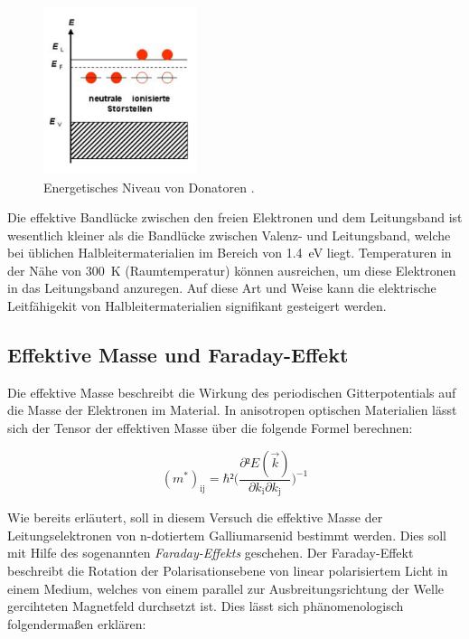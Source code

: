 \begin{figure}[H]
    \centering
    \includegraphics[width=0.4\textwidth]{content/nDot.png}
    \caption{Energetisches Niveau von Donatoren \cite{nDotierung}.}
    \label{fig:nDot}
\end{figure}

\noindent Die effektive Bandlücke zwischen den freien Elektronen und dem Leitungsband ist wesentlich kleiner als die Bandlücke 
zwischen Valenz- und Leitungsband, welche bei üblichen Halbleitermaterialien im Bereich von \qty{1.4}{\electronvolt} liegt. Temperaturen 
in der Nähe von \qty{300}{\kelvin} (Raumtemperatur) können ausreichen, um diese Elektronen in das Leitungsband anzuregen. 
Auf diese Art und Weise kann die elektrische Leitfähigekit von Halbleitermaterialien signifikant gesteigert werden. 

\subsection{Effektive Masse und Faraday-Effekt}

\noindent Die effektive Masse beschreibt die Wirkung des periodischen Gitterpotentials auf die Masse der Elektronen im Material.
In anisotropen optischen Materialien lässt sich der Tensor der effektiven Masse über die folgende Formel berechnen:

\begin{equation}
    (m^{\ast})_{\text{ij}} = \hbar²\biggl(\frac{\partial²E(\vec{k})}{\partial{}k_{\text{i}}\partial{}k_{\text{j}}}\biggr)^{-1}
    \label{eqn:meff}
\end{equation}

\noindent Wie bereits erläutert, soll in diesem Versuch die effektive Masse der Leitungselektronen von n-dotiertem Galliumarsenid bestimmt 
werden. Dies soll mit Hilfe des sogenannten \textit{Faraday-Effekts} geschehen. Der Faraday-Effekt beschreibt die Rotation der 
Polarisationsebene von linear polarisiertem Licht in einem Medium, welches von einem parallel zur Ausbreitungsrichtung der Welle gercihteten 
Magnetfeld durchsetzt ist. Dies lässt sich phänomenologisch folgendermaßen erklären: \\

